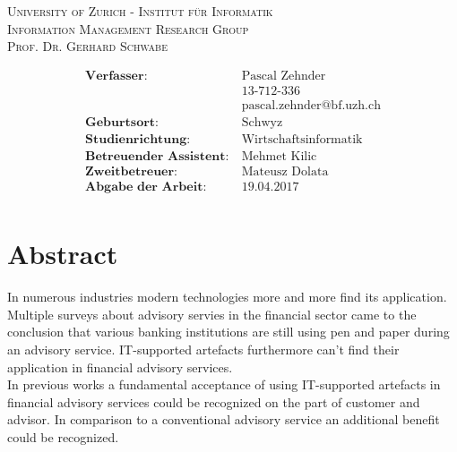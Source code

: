 \documentclass[a4paper,twoside, openright]{report}
\begin{document}
\begin{titlepage}
\scshape %
\large University of Zurich - Institut für Informatik \\ \vspace{3.5mm}
\large Information Management Research Group \\ \vspace{3.5mm}
\large Prof. Dr. Gerhard Schwabe

\vspace*{0.5\baselineskip}



\begin{align*}
\textbf{Verfasser:} &\ \text{Pascal Zehnder} \\
&\ \text{13-712-336} \\
&\ \text{pascal.zehnder@bf.uzh.ch} \\
\textbf{Geburtsort:} &\ \text{Schwyz} \\
\textbf{Studienrichtung:} &\ \text{Wirtschaftsinformatik} \\
\textbf{Betreuender Assistent:} &\ \text{Mehmet Kilic} \\
\textbf{Zweitbetreuer:} &\ \text{Mateusz Dolata} \\
\textbf{Abgabe der Arbeit:} &\ \text{19.04.2017} \\
\end{align*}

\endgroup
\end{titlepage}

\newpage


%
\chapter*{Abstract}
In numerous industries modern technologies more and more find its application. Multiple surveys about advisory servies in the financial sector came to the conclusion that various banking institutions are still using pen and paper during an advisory service. IT-supported artefacts furthermore can't find their application in financial advisory services.\\

In previous works a fundamental acceptance of using IT-supported artefacts in financial advisory services could be recognized on the part of customer and advisor. In comparison to a conventional advisory service an additional benefit could be recognized.\\
\end{document}
